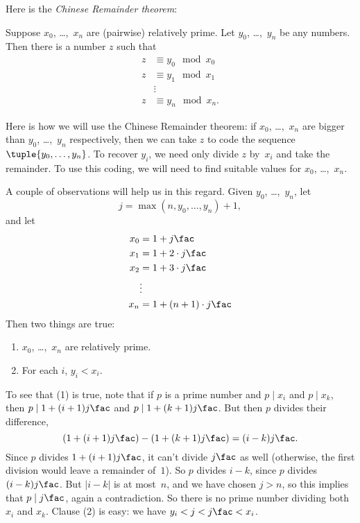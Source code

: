 \documentclass[../../../include/open-logic-section]{subfiles}
\begin{document}
Here is the \emph{Chinese Remainder theorem}:
\begin{thm}
Suppose $x_0$, \dots,~$x_n$ are (pairwise) relatively prime. Let
$y_0$, \dots,~$y_n$ be any numbers. Then there is a number $z$ such that
\begin{align*}
z & \equiv y_0 \mod x_0 \\
z & \equiv y_1 \mod x_1 \\
& \vdots  \\
z & \equiv y_n \mod x_n.
\end{align*}
\end{thm}

Here is how we will use the Chinese Remainder theorem: if $x_0$,
\dots,~$x_n$ are bigger than $y_0$, \dots,~$y_n$ respectively, then we
can take $z$ to code the sequence $\tuple{y_0, \dots,y_n}$. To recover
$y_i$, we need only divide $z$ by~$x_i$ and take the remainder. To use
this coding, we will need to find suitable values for $x_0$,
\dots,~$x_n$.

A couple of observations will help us in this regard. Given
$y_0$, \dots,~$y_n$, let
\[
j = \max(n, y_0, \dots, y_n) + 1,
\]
and let
\begin{align*}
x_0 & = 1 + j\fac \\
x_1 & = 1 + 2 \cdot j\fac \\
x_2 & = 1 + 3 \cdot j\fac \\
& \vdots  \\
x_n & = 1 + (n+1) \cdot j\fac
\end{align*}
Then two things are true:
\begin{enumerate}
\item $x_0$, \dots,~$x_n$ are relatively prime.
\item For each $i$, $y_i < x_i$.
\end{enumerate}
To see that (1) is true, note that if $p$ is a prime number and $p
\mid x_i$ and $p \mid x_k$, then $p \mid 1 + (i+1) j\fac$ and $p \mid
1 + (k+1) j\fac$. But then $p$ divides their difference,
\[
(1 + (i+1)j\fac) - (1+ (k+1)j\fac) = (i-k) j\fac.
\]
Since $p$ divides $1 + (i+1)j\fac$, it can't divide $j\fac$ as well
(otherwise, the first division would leave a remainder of~$1$). So $p$
divides $i-k$, since $p$ divides $(i-k)j\fac$. But $\left| i-k
\right|$ is at most~$n$, and we have chosen $j > n$, so this implies
that $p \mid j\fac$, again a contradiction. So there is no prime
number dividing both $x_i$ and $x_k$. Clause (2) is easy: we have $y_i <
j < j\fac < x_i$.
\end{document}
